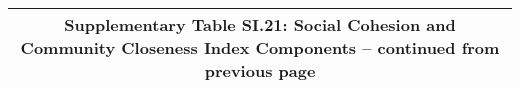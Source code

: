 \begin{longtable}{llcccccccccc}
\multicolumn{12}{c}{{\bfseries Supplementary Table SI.21: Social Cohesion and Community Closeness Index Components -- continued from previous page}} \\ \hline                                                                                                                                                                                                                                                                                                                                                                                                                                                                                                                                                                                                                                                                                                                            

\end{longtable}

